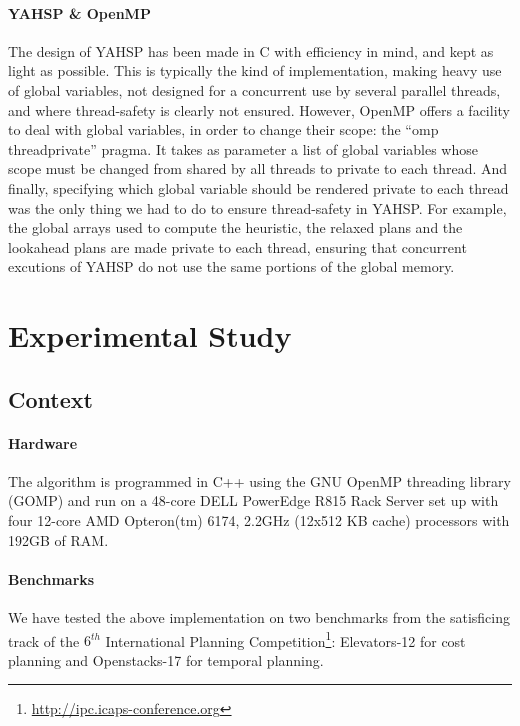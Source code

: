 \documentclass{sig-alternate}
\begin{document}
\paragraph{YAHSP \& OpenMP} %

The design  of YAHSP has  been made in  C with efficiency  in mind, and  kept as
light as  possible. This is typically  the kind of  implementation, making heavy
use of global  variables, not designed for a concurrent  use by several parallel
threads, and where thread-safety is clearly not ensured.  However, OpenMP offers
a facility  to deal with global variables,  in order to change  their scope: the
``omp threadprivate'' pragma.  It takes  as parameter a list of global variables
whose  scope must  be changed  from shared  by all  threads to  private  to each
thread.   And  finally, specifying  which  global  variable  should be  rendered
private to each thread  was the only thing we had to  do to ensure thread-safety
in YAHSP.   For example, the  global arrays used  to compute the  heuristic, the
relaxed plans and the lookahead plans  are made private to each thread, ensuring
that concurrent  excutions of YAHSP do not  use the same portions  of the global
memory.

\section{Experimental Study}

\subsection{Context}

\paragraph{Hardware} %
The algorithm is programmed in C++ using the GNU OpenMP threading library (GOMP) and run on a 48-core DELL PowerEdge R815 Rack Server set up with four 12-core AMD Opteron(tm) 6174, 2.2GHz (12x512 KB cache) processors with 192GB of RAM.

\paragraph{Benchmarks} %
We have tested the above implementation on two benchmarks from the satisficing track of the $6^{th}$ International Planning Competition\footnote{\url{http://ipc.icaps-conference.org}}: Elevators-12 for cost planning and Openstacks-17 for temporal planning.
\end{document}
